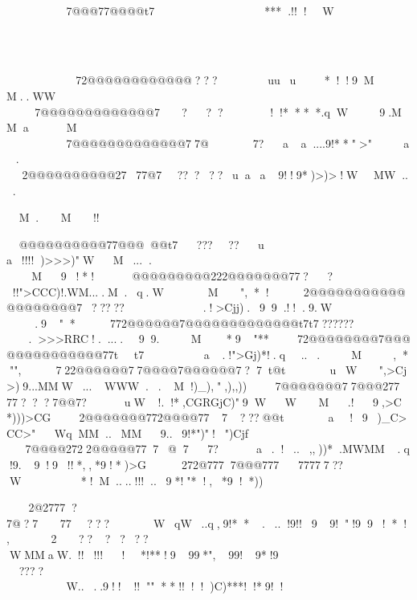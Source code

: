 
	

7@@@77@@@@t7***.!!!W








72@@@@@@@@@@@@???uuu*!!9MM..WW




		
7@@@@@@@@@@@@@7???!!****.qW9.MMaM

				
7@@@@@@@@@@@@@77@7?aa....9!**">"a.


2@@@@@@@@@@2777@7?????uaa9!!9*)>)>!WMW...

M.M!!

@@@@@@@@@@77@@@@@t7?????u
a!!!!)>>>)"WM....

M9!*!@@@@@@@@@222@@@@@@@77??!!">CCC)!.WM....M.q.WM",*!2@@@@@@@@@@@@@@@@@@@7?????.!>Cjj).99.!!.9.W
.9"*772@@@@@@7@@@@@@@@@@@@@t7t7??????.>>>RRC!.....99.M*9"**72@@@@@@@@7@@@@@@@@@@@@@@77tt7a.!">Gj\RC)*!.q...M,*"",722@@@@@@77@@@@7@@@@@@7?7t@tuW",>Cj\RG>)9...MMW...WWW..M!)_),",),,))7@@@@@@@77@@@27777???7@@7?uW!.!*,CGRGjC)"9WWM.!9,>C*)))>CG2@@@@@@@772@@@@777???@@ta!9)_C>CC>"WqMM..MM9..9!*")"!")Cjf
7@@@@2722@@@@@777@77?a.!..,,))*.MWMM.q!9.9!9!!*,,*9!*)>G
272@7777@@@77777777??
W*!M....!!!..9*!"*!,*9!*))

2@2777?7@?777???WqW..q,9!**...!9!!99!"!99!*!,
2??????
WMMaW.!!!!!!*!**!999*",99!9*!9

????
W....9!!!!""**!!!!)C)***!!*9!!

